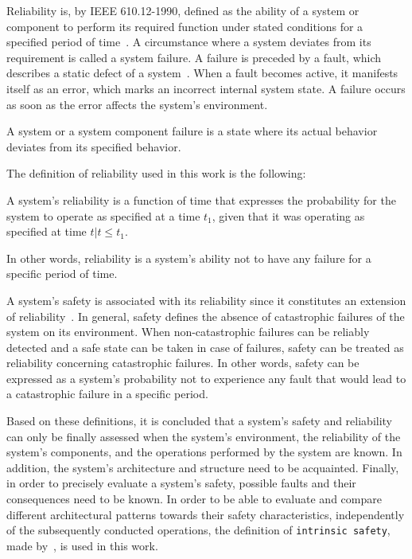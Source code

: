 Reliability is, by IEEE 610.12-1990, defined as the ability of a system or component to perform its required function under stated conditions for a specified period of time~\cite{ieee610.12}.
A circumstance where a system deviates from its requirement is called a system failure.
A failure is preceded by a fault, which describes a static defect of a system~\cite{AmmannOffutt2016}.
When a fault becomes active, it manifests itself as an error, which marks an incorrect internal system state.
A failure occurs as soon as the error affects the system's environment.

\begin{definition}
A system or a system component failure is a state where its actual behavior deviates from its specified behavior.
\end{definition}

The definition of reliability used in this work is the following:

\begin{definition}
\label{def:reliability}
A system's reliability is a function of time that expresses the probability for the system to operate as specified at a time $t_1$, given that it was operating as specified at time $t | t \leq t_1$.
\end{definition}

In other words, reliability is a system's ability not to have any failure for a specific period of time.

A system's safety is associated with its reliability since it constitutes an extension of reliability~\cite{AvizienisDependability2001}.
In general, safety defines the absence of catastrophic failures of the system on its environment.
When non-catastrophic failures can be reliably detected and a safe state can be taken in case of failures, safety can be treated as reliability concerning catastrophic failures.
In other words, safety can be expressed as a system's probability not to experience any fault that would lead to a catastrophic failure in a specific period.

Based on these definitions, it is concluded that a system's safety and reliability can only be finally assessed when the system's environment, the reliability of the system's components, and the operations performed by the system are known.
In addition, the system's architecture and structure need to be acquainted.
Finally, in order to precisely evaluate a system's safety, possible faults and their consequences need to be known.
In order to be able to evaluate and compare different architectural patterns towards their safety characteristics, independently of the subsequently conducted operations, the definition of \texttt{intrinsic safety}, made by~\cite{BoulangerStandards}, is used in this work.

